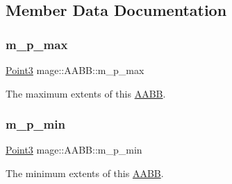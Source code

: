 \subsection{Member Data Documentation}
\hypertarget{structmage_1_1_a_a_b_b_a51643192d891301df8d8d3f24abd2a27}{}\label{structmage_1_1_a_a_b_b_a51643192d891301df8d8d3f24abd2a27} 
\subsubsection{\texorpdfstring{m\+\_\+p\+\_\+max}{m\_p\_max}}
{\footnotesize\ttfamily \hyperlink{structmage_1_1_point3}{Point3} mage\+::\+A\+A\+B\+B\+::m\+\_\+p\+\_\+max}

The maximum extents of this \hyperlink{structmage_1_1_a_a_b_b}{A\+A\+BB}. \hypertarget{structmage_1_1_a_a_b_b_af5b7608aa0e332d70edfe0cb77bd27c2}{}\label{structmage_1_1_a_a_b_b_af5b7608aa0e332d70edfe0cb77bd27c2} 
\subsubsection{\texorpdfstring{m\+\_\+p\+\_\+min}{m\_p\_min}}
{\footnotesize\ttfamily \hyperlink{structmage_1_1_point3}{Point3} mage\+::\+A\+A\+B\+B\+::m\+\_\+p\+\_\+min}

The minimum extents of this \hyperlink{structmage_1_1_a_a_b_b}{A\+A\+BB}. 